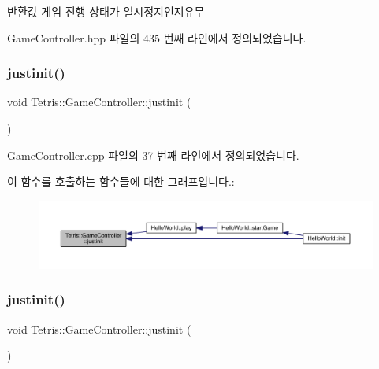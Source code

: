 \begin{DoxyReturn}{반환값}
게임 진행 상태가 일시정지인지유무 
\end{DoxyReturn}


Game\+Controller.\+hpp 파일의 435 번째 라인에서 정의되었습니다.

\mbox{\label{class_tetris_1_1_game_controller_aef406397d4719c9edd49774d0343ce05}} 
\subsubsection{\texorpdfstring{justinit()}{justinit()}\hspace{0.1cm}{\footnotesize\ttfamily [1/2]}}
{\footnotesize\ttfamily void Tetris\+::\+Game\+Controller\+::justinit (\begin{DoxyParamCaption}{ }\end{DoxyParamCaption})}



Game\+Controller.\+cpp 파일의 37 번째 라인에서 정의되었습니다.

이 함수를 호출하는 함수들에 대한 그래프입니다.\+:
\nopagebreak
\begin{figure}[H]
\begin{center}
\leavevmode
\includegraphics[width=350pt]{class_tetris_1_1_game_controller_aef406397d4719c9edd49774d0343ce05_icgraph}
\end{center}
\end{figure}
\mbox{\label{class_tetris_1_1_game_controller_aef406397d4719c9edd49774d0343ce05}} 
\subsubsection{\texorpdfstring{justinit()}{justinit()}\hspace{0.1cm}{\footnotesize\ttfamily [2/2]}}
{\footnotesize\ttfamily void Tetris\+::\+Game\+Controller\+::justinit (\begin{DoxyParamCaption}{ }\end{DoxyParamCaption})\hspace{0.3cm}{\ttfamily [inline]}}



